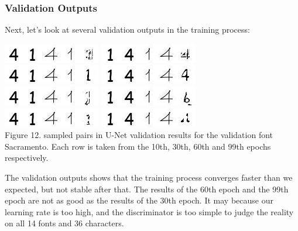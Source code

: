 \documentclass[letterpaper]{article}
\begin{document}
\subsubsection{Validation Outputs}
Next, let's look at several validation outputs in the training process:

\begin{center}
    \includegraphics[width=.2\textwidth]{./report-figs/3.sac.1.jpg}
    \includegraphics[width=.2\textwidth]{./report-figs/3.sac.2.jpg}\\
    \includegraphics[width=.2\textwidth]{./report-figs/3.sac.3.jpg}
    \includegraphics[width=.2\textwidth]{./report-figs/3.sac.4.jpg}\\
    \includegraphics[width=.2\textwidth]{./report-figs/3.sac.5.jpg}
    \includegraphics[width=.2\textwidth]{./report-figs/3.sac.6.jpg}\\
    \includegraphics[width=.2\textwidth]{./report-figs/3.sac.7.jpg}
    \includegraphics[width=.2\textwidth]{./report-figs/3.sac.8.jpg}\\

    Figure 12. sampled pairs in U-Net validation results for the validation font Sacramento. Each row is taken from the 10th, 30th, 60th and 99th epochs respectively.
\end{center}
The validation outputs shows that the training process converges faster than we expected, but not stable after that. The results of the 60th epoch and the 99th epoch are not as good as the results of the 30th epoch. It may because our learning rate is too high, and the discriminator is too simple to judge the reality on all 14 fonts and 36 characters.
\end{document}
